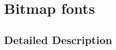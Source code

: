 \hypertarget{group____bmpfont}{\section{Bitmap fonts}
\label{group____bmpfont}
}


\subsection{Detailed Description}

